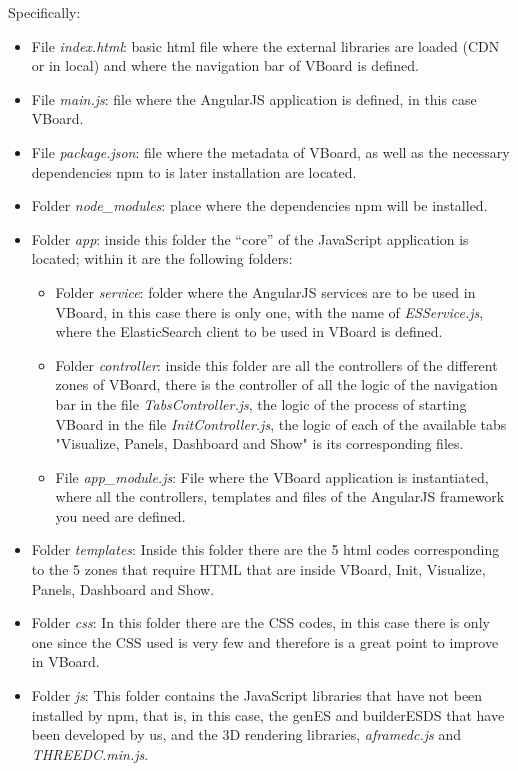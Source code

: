 \documentclass[a4paper, 12pt]{book}
\begin{document}
Specifically:
\begin{itemize}
    \item File \textit{index.html}: basic html file where the external libraries are loaded (CDN or in local) and where the navigation bar of VBoard is defined.
    \item File \textit{main.js}: file where the AngularJS application is defined, in this case VBoard.
    \item File \textit{package.json}: file where the metadata of VBoard, as well as the necessary dependencies npm to is later installation are located.
    \item Folder \textit{node\_modules}: place where the dependencies npm will be installed.
     \item Folder \textit{app}: inside this folder the “core” of the JavaScript application is located; within it are the following folders: 
    \begin{itemize}
        \item Folder \textit{service}: folder where the AngularJS services are to be used in VBoard, in this case there is only one, with the name of \textit{ESService.js}, where the ElasticSearch client to be used in VBoard is defined.
        \item Folder \textit{controller}:  inside this folder are all the controllers of the different zones of VBoard, there is the controller of all the logic of the navigation bar in the file \textit{TabsController.js}, the logic of the process of starting VBoard in the file \textit{InitController.js}, the logic of each of the available tabs "Visualize, Panels, Dashboard and Show" is its corresponding files.
        \item File \textit{app\_module.js}: File where the VBoard application is instantiated, where all the controllers, templates and files of the AngularJS framework you need are defined.
    \end{itemize}
    \item Folder \textit{templates}: Inside this folder there are the 5 html codes corresponding to the 5 zones that require HTML that are inside VBoard, Init, Visualize, Panels, Dashboard and Show.
    \item Folder \textit{css}: In this folder there are the CSS codes, in this case there is only one since the CSS used is very few and therefore is a great point to improve in VBoard.
    \item Folder \textit{js}: This folder contains the JavaScript libraries that have not been installed by npm, that is, in this case, the genES and builderESDS that have been developed by us, and the 3D rendering libraries, \textit{aframedc.js} and \textit{THREEDC.min.js}.
\end{itemize}
\end{document}
